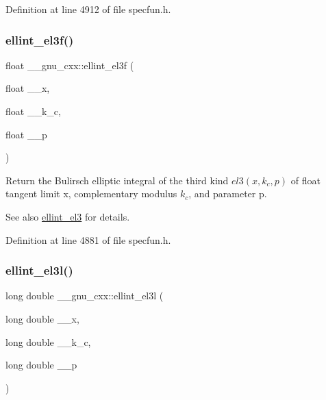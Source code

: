 Definition at line 4912 of file specfun.\+h.

\mbox{\label{group__mathsf__gnu_ga66131a8ecc14b5228a73a01121f60a35}} 
\subsubsection{\texorpdfstring{ellint\+\_\+el3f()}{ellint\_el3f()}}
{\footnotesize\ttfamily float \+\_\+\+\_\+gnu\+\_\+cxx\+::ellint\+\_\+el3f (\begin{DoxyParamCaption}\item[{float}]{\+\_\+\+\_\+x,  }\item[{float}]{\+\_\+\+\_\+k\+\_\+c,  }\item[{float}]{\+\_\+\+\_\+p }\end{DoxyParamCaption})\hspace{0.3cm}{\ttfamily [inline]}}

Return the Bulirsch elliptic integral of the third kind $ el3(x,k_c,p) $ of {\ttfamily float} tangent limit {\ttfamily x}, complementary modulus $ k_c $, and parameter {\ttfamily p}.

\begin{DoxySeeAlso}{See also}
\hyperlink{group__mathsf__gnu_gaac07922e08fdf46cd509ff0cfa9ea1f0}{ellint\+\_\+el3} for details. 
\end{DoxySeeAlso}


Definition at line 4881 of file specfun.\+h.

\mbox{\label{group__mathsf__gnu_ga0d90e66f799a2ebe4bec43eef0d53355}} 
\subsubsection{\texorpdfstring{ellint\+\_\+el3l()}{ellint\_el3l()}}
{\footnotesize\ttfamily long double \+\_\+\+\_\+gnu\+\_\+cxx\+::ellint\+\_\+el3l (\begin{DoxyParamCaption}\item[{long double}]{\+\_\+\+\_\+x,  }\item[{long double}]{\+\_\+\+\_\+k\+\_\+c,  }\item[{long double}]{\+\_\+\+\_\+p }\end{DoxyParamCaption})\hspace{0.3cm}{\ttfamily [inline]}}

